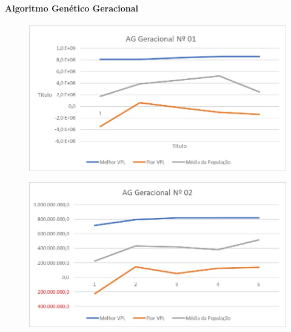 \documentclass[12pt,a4paper]{report}
\begin{document}
\appendix

\chapter{}
\subsubsection{Algoritmo Genético Geracional}


\begin{figure}[H]
\centering

\includegraphics[scale=1]{AGG/1}

\end{figure}

\begin{figure}[H]
\centering

\includegraphics[scale=1]{AGG/2}

\end{figure}
\end{document}
